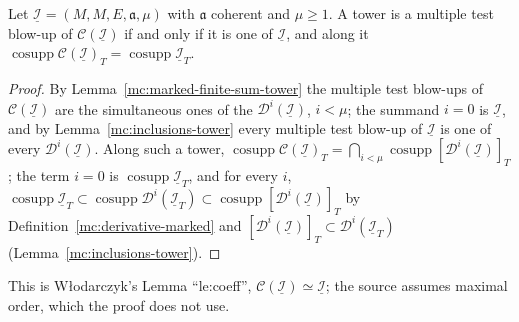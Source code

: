 \begin{lemma}
\label{mc:coefficient-equivalent}
\leanok
Let \(\underline{\mathcal I}=(M,M,E,\mathfrak a,\mu)\) with \(\mathfrak a\) coherent and \(\mu\ge1\). A tower is a multiple test blow-up of
\(\mathcal C(\underline{\mathcal I})\) if and only if it is one of \(\underline{\mathcal I}\), and along it
\(\operatorname{cosupp}\mathcal C(\underline{\mathcal I})_T=\operatorname{cosupp}\underline{\mathcal I}_T\).
\end{lemma}
\begin{proof}
\leanok
By Lemma~\ref{mc:marked-finite-sum-tower} the multiple test blow-ups of \(\mathcal C(\underline{\mathcal I})\) are the simultaneous ones of the
\(\mathcal D^i(\underline{\mathcal I})\), \(i<\mu\); the summand \(i=0\) is \(\underline{\mathcal I}\), and by Lemma~\ref{mc:inclusions-tower} every multiple test blow-up
of \(\underline{\mathcal I}\) is one of every \(\mathcal D^i(\underline{\mathcal I})\). Along such a tower,
\(\operatorname{cosupp}\mathcal C(\underline{\mathcal I})_T=\bigcap_{i<\mu}\operatorname{cosupp}[\mathcal D^i(\underline{\mathcal I})]_T\); the term \(i=0\) is
\(\operatorname{cosupp}\underline{\mathcal I}_T\), and for every \(i\), \(\operatorname{cosupp}\underline{\mathcal I}_T\subset\operatorname{cosupp}\mathcal D^i(\underline{\mathcal I}_T)\subset
\operatorname{cosupp}[\mathcal D^i(\underline{\mathcal I})]_T\) by Definition~\ref{mc:derivative-marked} and \([\mathcal D^i(\underline{\mathcal I})]_T\subset\mathcal D^i(\underline{\mathcal I}_T)\)
(Lemma~\ref{mc:inclusions-tower}).
\end{proof}
This is Włodarczyk's Lemma ``le:coeff'', \(\mathcal C(\underline{\mathcal I})\simeq\underline{\mathcal I}\); the source assumes maximal order, which the proof does not use.

